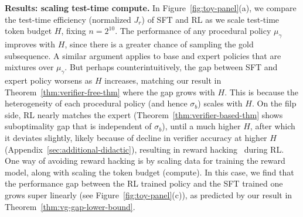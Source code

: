 \textbf{Results: scaling test-time compute.} In Figure~\ref{fig:toy-panel}(a), we compare the test-time efficiency (normalized $J_r$) of SFT and RL as we scale test-time token budget $H$,  fixing $n$$=$$2^{10}$. The performance of any procedural policy $\mu_\gamma$ improves with $H$, since there is a greater chance of sampling the gold subsequence. A similar argument applies to base and expert policies that are mixtures over $\mu_\gamma$. But perhaps counterintuitively, the gap between SFT and expert policy worsens as $H$ increases, matching our result in Theorem~\ref{thm:verifier-free-thm} where the gap grows with $H$. This is because the heterogeneity of each procedural policy (and hence $\sigma_b$) scales with $H$. On the filp side, RL  nearly matches the expert (Theorem~\ref{thm:verifier-based-thm} shows suboptimality gap that is independent of $\sigma_b$), until a much higher $H$, after which it deviates slightly, likely because of decline in verifier accuracy at higher $H$ (Appendix~\ref{sec:additional-didactic}), resulting in reward hacking~\cite{gao2023scaling} during RL. One way of avoiding reward hacking is by scaling  data for training the reward model, along with scaling the token budget (compute). In this case, we find that the performance gap between the RL trained policy and the SFT trained one grows super linearly (see Figure~\ref{fig:toy-panel}(c)), as predicted by our result in Theorem~\ref{thm:vg-gap-lower-bound}.  




